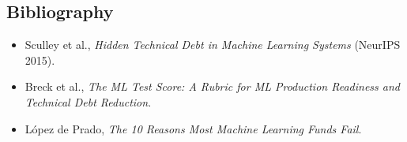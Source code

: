 \documentclass[10pt,a4paper]{article}
\begin{document}
\subsection*{Bibliography}
\begin{itemize}
    \item Sculley et al., \textit{Hidden Technical Debt in Machine Learning Systems} (NeurIPS 2015).
    \item Breck et al., \textit{The ML Test Score: A Rubric for ML Production Readiness and Technical Debt Reduction}.
    \item López de Prado, \textit{The 10 Reasons Most Machine Learning Funds Fail}.
\end{itemize}
\end{document}
